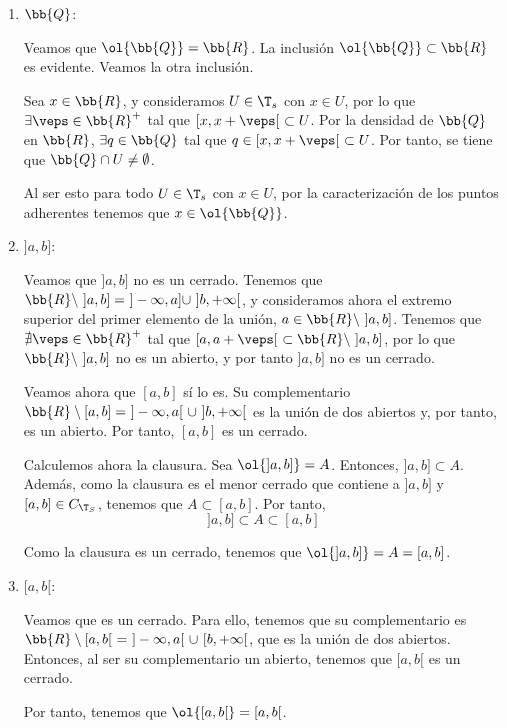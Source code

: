 \begin{ejercicio}
\begin{enumerate}
        \item $\bb{Q}$:

        Veamos que $\ol{\bb{Q}}=\bb{R}$. La inclusión $\ol{\bb{Q}}\subset \bb{R}$ es evidente. Veamos la otra inclusión.

        Sea $x\in \bb{R}$, y consideramos $U\in \T_s$ con $x\in U$, por lo que $\exists \veps\in \bb{R}^+$ tal que $[x,x+\veps[~\subset U$. Por la densidad de $\bb{Q}$ en $\bb{R}$, $\exists q\in \bb{Q}$ tal que $q\in [x,x+\veps[~\subset U$. Por tanto, se tiene que $\bb{Q}\cap U\neq \emptyset$.
        
        Al ser esto para todo $U\in \T_s$ con $x\in U$, por la caracterización de los puntos adherentes tenemos que $x\in \ol{\bb{Q}}$.
        
        \item $]a,b]$:

        Veamos que $]a,b]$ no es un cerrado. Tenemos que $\bb{R}\setminus~]a,b]=~]-\infty, a]\cup ~]b,+\infty[$, y consideramos ahora el extremo superior del primer elemento de la unión, $a\in \bb{R}\setminus~]a,b]$. Tenemos que $\nexists \veps\in \bb{R}^+$ tal que $[a,a+\veps[~\subset \bb{R}\setminus~]a,b]$, por lo que $\bb{R}\setminus~]a,b]$ no es un abierto, y por tanto $]a,b]$ no es un cerrado.

        Veamos ahora que $[a,b]$ sí lo es. Su complementario $\bb{R}\setminus [a,b]=~]-\infty, a[~\cup ~]b,+\infty[$ es la unión de dos abiertos y, por tanto, es un abierto. Por tanto, $[a,b]$ es un cerrado.

        Calculemos ahora la clausura. Sea $\ol{]a,b]}=A$. Entonces, $]a,b]\subset A$. Además, como la clausura es el menor cerrado que contiene a $]a,b]$ y $[a,b]\in C_{\T_S}$, tenemos que $A\subset [a,b]$. Por tanto,
        \begin{equation*}
            ]a,b]\subset A\subset [a,b]
        \end{equation*}

        Como la clausura es un cerrado, tenemos que $\ol{]a,b]}=A=[a,b]$.
        
        \item $[a,b[$:

        Veamos que es un cerrado. Para ello, tenemos que su complementario es $\bb{R}\setminus [a,b[~=~]-\infty, a[~\cup~[b,+\infty[$, que es la unión de dos abiertos. Entonces, al ser su complementario un abierto, tenemos que $[a,b[$ es un cerrado.

        Por tanto, tenemos que $\ol{[a,b[}=[a,b[$.
        

\end{enumerate}
\end{ejercicio}
